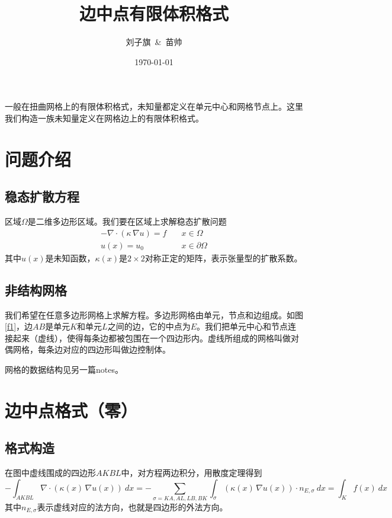 \documentclass[12pt,a4paper]{article}
\title{边中点有限体积格式}
\author{刘子旗~\&~苗帅}
\date{\today}
\theoremstyle{plain}
\begin{document}
\maketitle

一般在扭曲网格上的有限体积格式，未知量都定义在单元中心和网格节点上。这里我们构造一族未知量定义在网格边上的有限体积格式。

\section*{问题介绍}

\subsection*{稳态扩散方程}

区域$\Omega$是二维多边形区域。我们要在区域上求解稳态扩散问题
\begin{equation*}
\begin{split}
- \nabla \cdot (\kappa \, \nabla u) = f & \quad x \in \Omega \\
u(x) = u_0 & \quad x \in \partial \Omega
\end{split}
\end{equation*}
其中$u(x)$是未知函数，$\kappa(x)$是$2 \times 2$对称正定的矩阵，表示张量型的扩散系数。

\subsection*{非结构网格}

我们希望在任意多边形网格上求解方程。多边形网格由单元，节点和边组成。如图\ref{f1}，边$AB$是单元$K$和单元$L$之间的边，它的中点为$E$。我们把单元中心和节点连接起来（虚线），使得每条边都被包围在一个四边形内。虚线所组成的网格叫做对偶网格，每条边对应的四边形叫做边控制体。

网格的数据结构见另一篇notes。

\section*{边中点格式（零）}

\subsection*{格式构造}

在图中虚线围成的四边形$AKBL$中，对方程两边积分，用散度定理得到
\begin{equation*}
- \int_{AKBL} \nabla \cdot (\kappa(x) \, \nabla u(x)) \ dx = - \sum_{\sigma = KA, AL, LB, BK} \int_{\sigma} (\kappa(x) \, \nabla u(x)) \cdot n_{E, \sigma} \ dx = \int_{K} f(x) \ dx
\end{equation*}
其中$n_{E, \sigma}$表示虚线对应的法方向，也就是四边形的外法方向。
\end{document}
